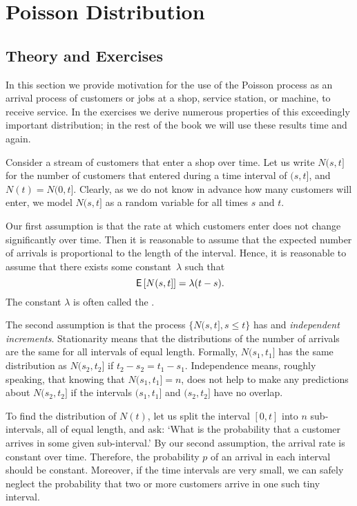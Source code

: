 \section{Poisson Distribution}
\label{sec:poisson-distribution}

\subsection*{Theory and Exercises}



In this section we provide motivation for the use of the Poisson process as an arrival process of customers or jobs at a shop, service station, or machine, to receive service.  In the exercises we derive numerous  properties of  this exceedingly important distribution; in the rest of the book we will use these results time and again.

Consider a stream of customers that enter a shop over time. Let us write $N(s, t]$ for
the number of customers that entered during a time interval of $(s,t]$, and $N(t)=N(0,t]$. Clearly, as we do not know in advance how many customers will enter, we model $N(s,t]$ as a random variable for all
times $s$ and $t$.

Our first assumption is that the rate at which customers enter does not
change significantly over time. Then it is reasonable to assume that
the expected number of arrivals is proportional to the  length of
the interval. Hence, it is reasonable to assume that there exists some
constant~$\lambda$ such that
\begin{equation}
  \label{eq:6}
 \,\mathsf{E}\left[N(s,t]\right] = \lambda (t-s).
\end{equation}
The constant $\lambda$ is often called the .


The second assumption is that the process $\{N(s,t], s\leq t\}$ has
 and \emph{independent increments}. Stationarity
means that the distributions of the number of arrivals are the same for
all intervals of equal length. Formally, $N(s_1,t_1]$ has the same
distribution as $N(s_2, t_2]$ if $t_2-s_2 = t_1-s_1$. Independence
means, roughly speaking, that knowing that $N(s_1,t_1]= n$, does not
help to make any predictions about $N(s_2, t_2]$ if the intervals
$(s_1,t_1]$ and $(s_2, t_2]$ have no overlap.

To find the distribution of $N(t)$, let us split the interval
$[0,t]$ into $n$ sub-intervals, all of equal length, and ask: `What is
the probability that a customer arrives in some given
sub-interval.'  By our second assumption, the arrival rate is
constant over time. Therefore, the probability $p$ of an arrival in each
interval should be constant. Moreover,
if the time intervals are very small, we can safely neglect the
probability that two or more customers arrive in one such tiny interval.

